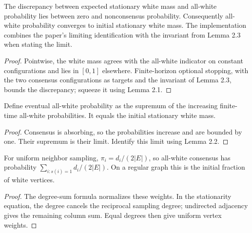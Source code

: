 \begin{lemma}\label{lem:22}
\leanok{}
The discrepancy between expected stationary white mass and all-white
probability lies between zero and nonconsensus probability. Consequently
all-white probability converges to initial stationary white mass.
The implementation combines the paper's limiting identification with the
invariant from Lemma 2.3 when stating the limit.
\end{lemma}
\begin{proof}\leanok
Pointwise, the white mass agrees with the all-white indicator on constant
configurations and lies in $[0,1]$ elsewhere. Finite-horizon optional stopping,
with the two consensus configurations as targets and the invariant of Lemma 2.3,
bounds the discrepancy; squeeze it using Lemma 2.1.
\end{proof}
\begin{theorem}[Theorem 2.1]\label{thm:21}
\leanok{}
Define eventual all-white probability as the supremum of the increasing
finite-time all-white probabilities. It equals the initial stationary white mass.
\end{theorem}
\begin{proof}\leanok
Consensus is absorbing, so the probabilities increase and are bounded by one.
Their supremum is their limit. Identify this limit using Lemma 2.2.
\end{proof}
\begin{theorem}\label{cor:22}
\leanok{}
For uniform neighbor sampling, $\pi_i=d_i/(2|E|)$, so all-white consensus has
probability $\sum_{i:s(i)=1}d_i/(2|E|)$. On a regular graph this is the initial
fraction of white vertices.
\end{theorem}
\begin{proof}\leanok
The degree-sum formula normalizes these weights. In the stationarity equation,
the degree cancels the reciprocal sampling degree; undirected adjacency gives
the remaining column sum. Equal degrees then give uniform vertex weights.
\end{proof}

